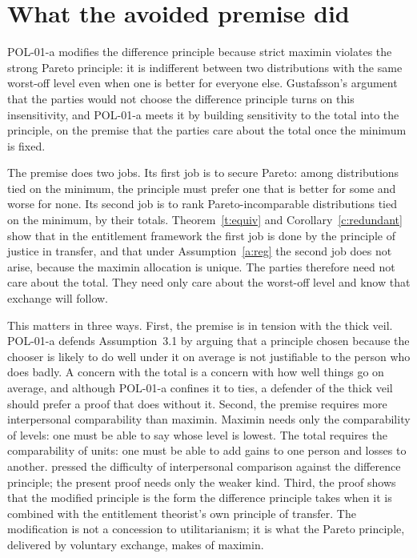 \documentclass{situationist-preprint}
\begin{document}
\section{What the avoided premise did}\label{s:premise}

POL-01-a modifies the difference principle because strict maximin violates the strong Pareto principle: it is indifferent between two distributions with the same worst-off level even when one is better for everyone else. Gustafsson's argument that the parties would not choose the difference principle turns on this insensitivity, and POL-01-a meets it by building sensitivity to the total into the principle, on the premise that the parties care about the total once the minimum is fixed.

The premise does two jobs. Its first job is to secure Pareto: among distributions tied on the minimum, the principle must prefer one that is better for some and worse for none. Its second job is to rank Pareto-incomparable distributions tied on the minimum, by their totals. Theorem~\ref{t:equiv} and Corollary~\ref{c:redundant} show that in the entitlement framework the first job is done by the principle of justice in transfer, and that under Assumption~\ref{a:reg} the second job does not arise, because the maximin allocation is unique. The parties therefore need not care about the total. They need only care about the worst-off level and know that exchange will follow.

This matters in three ways. First, the premise is in tension with the thick veil. POL-01-a defends Assumption~3.1 by arguing that a principle chosen because the chooser is likely to do well under it on average is not justifiable to the person who does badly. A concern with the total is a concern with how well things go on average, and although POL-01-a confines it to ties, a defender of the thick veil should prefer a proof that does without it. Second, the premise requires more interpersonal comparability than maximin. Maximin needs only the comparability of levels: one must be able to say whose level is lowest. The total requires the comparability of units: one must be able to add gains to one person and losses to another. \citet{Arrow1973} pressed the difficulty of interpersonal comparison against the difference principle; the present proof needs only the weaker kind. Third, the proof shows that the modified principle is the form the difference principle takes when it is combined with the entitlement theorist's own principle of transfer. The modification is not a concession to utilitarianism; it is what the Pareto principle, delivered by voluntary exchange, makes of maximin.
\end{document}
